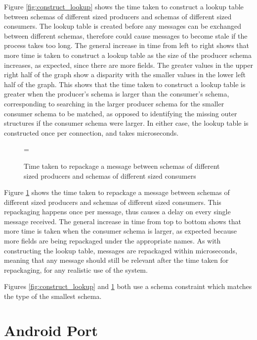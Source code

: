 \documentclass[12pt,twoside,notitlepage]{report}
\begin{document}
Figure \ref{fig:construct_lookup} shows the time taken to construct a lookup table between schemas of different sized producers and schemas of different sized consumers. 
The lookup table is created before any messages can be exchanged between different schemas, therefore could cause messages to become stale if the process takes too long.
The general increase in time from left to right shows that more time is taken to construct a lookup table as the size of the producer schema increases, as expected, since there are more fields. 
The greater values in the upper right half of the graph show a disparity with the smaller values in the lower left half of the graph. 
This shows that the time taken to construct a lookup table is greater when the producer's schema is larger than the consumer's schema, corresponding to searching in the larger producer schema for the smaller consumer schema to be matched, as opposed to identifying the missing outer structures if the consumer schema were larger.
In either case, the lookup table is constructed once per connection, and takes microseconds.

\begin{figure}[tbh]
\epsfxsize=\hsize
\centerline{}
\caption[Repackage Message]{Time taken to repackage a message between schemas of different sized producers and schemas of different sized consumers}
\label{fig:repack_message}
\end{figure}

Figure \ref{fig:repack_message} shows the time taken to repackage a message between schemas of different sized producers and schemas of different sized consumers. 
This repackaging happens once per message, thus causes a delay on every single message received. 
The general increase in time from top to bottom shows that more time is taken when the consumer schema is larger, as expected because more fields are being repackaged under the appropriate names. 
As with constructing the lookup table, messages are repackaged within microseconds, meaning that any message should still be relevant after the time taken for repackaging, for any realistic use of the system. 

Figures \ref{fig:construct_lookup} and \ref{fig:repack_message} both use a schema constraint which matches the type of the smallest schema.

\section{Android Port}
\end{document}
